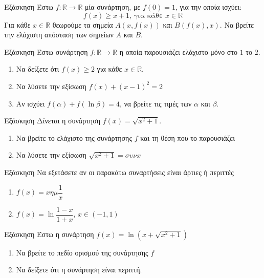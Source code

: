 \documentclass{presentation}
\begin{document}
\begin{frame}{Εξάσκηση}
      Έστω $f:\mathbb{R}\to\mathbb{R}$ μία συνάρτηση, με $f(0)=1$, για την οποία ισχύει:
      $$f(x)\ge x+1 \text{, για κάθε } x\in\mathbb{R}$$
      Για κάθε $x\in\mathbb{R}$ θεωρούμε τα σημεία $Α(x,f(x))$ και $Β(f(x),x)$. Να βρείτε την ελάχιστη απόσταση των σημείων $Α$ και $Β$.
\end{frame}

\begin{frame}{Εξάσκηση}
      Έστω συνάρτηση $f:\mathbb{R}\to \mathbb{R}$ η οποία παρουσιάζει ελάχιστο μόνο στο $1$ το $2$.
      \begin{enumerate}
            \item Να δείξετε ότι $f(x)\ge 2$ για κάθε $x\in\mathbb{R}$. \pause
            \item Να λύσετε την εξίσωση $f(x)+(x-1)^2=2$ \pause
            \item Αν ισχύει $f(α)+f(\ln β)=4$, να βρείτε τις τιμές των $α$ και $β$.
      \end{enumerate}
\end{frame}

\begin{frame}{Εξάσκηση}
      Δίνεται η συνάρτηση $f(x)=\sqrt{x^2+1}$.
      \begin{enumerate}
            \item Να βρείτε το ελάχιστο της συνάρτησης $f$ και τη θέση που το παρουσιάζει \pause
            \item Να λύσετε την εξίσωση $\sqrt{x^2+1}=συνx$
      \end{enumerate}
\end{frame}

\begin{frame}{Εξάσκηση}
      Να εξετάσετε αν οι παρακάτω συναρτήσεις είναι άρτιες ή περιττές
      \begin{enumerate}
            \item $f(x)=xημ\dfrac{1}{x}$ \pause
            \item $f(x)=\ln \dfrac{1-x}{1+x}$, $x\in (-1,1)$
      \end{enumerate}
\end{frame}

\begin{frame}{Εξάσκηση}
      Έστω η συνάρτηση $f(x)=\ln (x+\sqrt{x^2+1})$
      \begin{enumerate}
            \item Να βρείτε το πεδίο ορισμού της συνάρτησης $f$ \pause
            \item Να δείξετε ότι η συνάρτηση είναι περιττή.
      \end{enumerate}
\end{frame}
\end{document}
